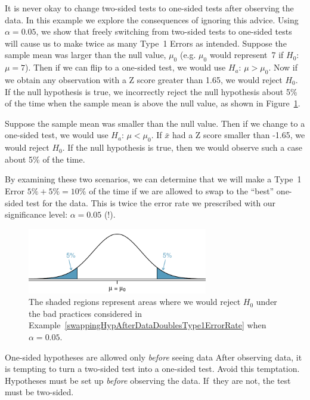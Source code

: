 \begin{example}{It is never okay to change two-sided tests to one-sided tests after observing the data. In this example we explore the consequences of ignoring this advice. Using $\alpha=0.05$, we show that freely switching from two-sided tests to one-sided tests will cause us to make twice as many Type~1 Errors as intended.} \label{swappingHypAfterDataDoublesType1ErrorRate}
Suppose the sample mean was larger than the null value, $\mu_0$ (e.g. $\mu_0$ would represent~7 if $H_0$:~$\mu = 7$). Then if we can flip to a one-sided test, we would use $H_a$: $\mu > \mu_0$. Now if we obtain any observation with a Z score greater than 1.65, we would reject $H_0$. If the null hypothesis is true, we incorrectly reject the null hypothesis about 5\% of the time when the sample mean is above the null value, as shown in Figure~\ref{type1ErrorDoublingExampleFigure}.

Suppose the sample mean was smaller than the null value. Then if we change to a one-sided test, we would use $H_a$: $\mu < \mu_0$. If $\bar{x}$ had a Z score smaller than -1.65, we would reject $H_0$. If the null hypothesis is true, then we would observe such a case about 5\% of the time.

By examining these two scenarios, we can determine that we will make a Type~1 Error $5\%+5\%=10\%$ of the time if we are allowed to swap to the ``best'' one-sided test for the data. This is twice the error rate we prescribed with our significance level: $\alpha=0.05$ (!).

\begin{figure}
   \centering
   \includegraphics[width=0.7\textwidth]{04/figures/type1ErrorDoublingExampleFigure/type1ErrorDoublingExampleFigure}
   \caption{The shaded regions represent areas where we would reject $H_0$ under the bad practices considered in Example~\ref{swappingHypAfterDataDoublesType1ErrorRate} when $\alpha = 0.05$.}
   \label{type1ErrorDoublingExampleFigure}
\end{figure}

\end{example}

\begin{caution}{One-sided hypotheses are allowed only \emph{before} seeing data}
{After observing data, it is tempting to turn a two-sided test into a one-sided test. Avoid this temptation. Hypotheses must be set up \emph{before} observing the data. If~they are not, the test must be two-sided.}
\end{caution}


